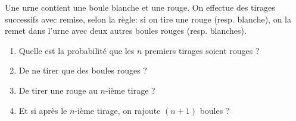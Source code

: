 \documentclass[12pt]{article}
\begin{document}
\begin{exercise}
	Une urne contient une boule blanche et une rouge. On effectue des tirages successifs avec remise, selon la règle: si on tire une rouge (resp. blanche), on la remet dans l'urne avec deux autres boules rouges (resp. blanches).
	\begin{enumerate}
		\item Quelle est la probabilité que les $n$ premiers tirages soient rouges ?
		\item De ne tirer que des boules rouges ?
		\item De tirer une rouge au $n$-ième tirage ?
		\item Et si après le $n$-ième tirage, on rajoute $(n+1)$ boules ?
	\end{enumerate}
\end{exercise}
\end{document}
